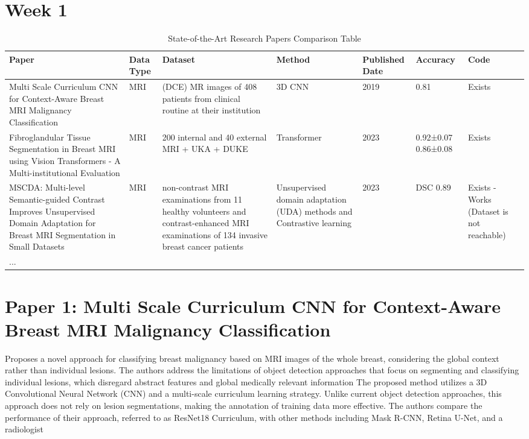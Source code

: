 \documentclass{article}
\begin{document}
\section*{\LARGE Week 1}
\begin{table}[htbp]
    \caption{State-of-the-Art Research Papers Comparison Table}
    \label{tab:comparison}
    \begin{tabular}{p{4cm} p{0.75cm} p{4cm} p{2cm} p{1.5cm} p{1.5cm} p{1.5cm}}
        \toprule
        \textbf{Paper} & \textbf{Data Type} & \textbf{Dataset} & \textbf{Method} & \textbf{Published Date} & \textbf{Accuracy} & \textbf{Code} \\
        \midrule
        Multi Scale Curriculum CNN for Context-Aware Breast MRI Malignancy Classification & MRI & (DCE) MR images of 408 patients from clinical routine at their institution & 3D CNN & 2019 & 0.81 & Exists \\
        Fibroglandular Tissue Segmentation in Breast MRI using Vision Transformers - A Multi-institutional Evaluation & MRI & 200 internal and 40 external MRI + UKA + DUKE & Transformer & 2023 & 0.92±0.07 0.86±0.08 & Exists \\
        MSCDA: Multi-level Semantic-guided Contrast
Improves Unsupervised Domain Adaptation for Breast
MRI Segmentation in Small Datasets & MRI & non-contrast MRI examinations from 11 healthy volunteers and contrast-enhanced MRI examinations of 134 invasive breast cancer patients & Unsupervised domain adaptation (UDA) methods and Contrastive learning & 2023 & DSC 0.89 & Exists - Works (Dataset is not reachable) \\
        ... \\
        \bottomrule
    \end{tabular}
\end{table}



\section{Paper 1: Multi Scale Curriculum CNN for Context-Aware Breast MRI Malignancy Classification}
Proposes a novel approach for classifying breast malignancy based on MRI images of the whole breast, considering the global context rather than individual lesions. The authors address the limitations of object detection approaches that focus on segmenting and classifying individual lesions, which disregard abstract features and global medically relevant information
The proposed method utilizes a 3D Convolutional Neural Network (CNN) and a multi-scale curriculum learning strategy. Unlike current object detection approaches, this approach does not rely on lesion segmentations, making the annotation of training data more effective. The authors compare the performance of their approach, referred to as ResNet18 Curriculum, with other methods including Mask R-CNN, Retina U-Net, and a radiologist
\end{document}
